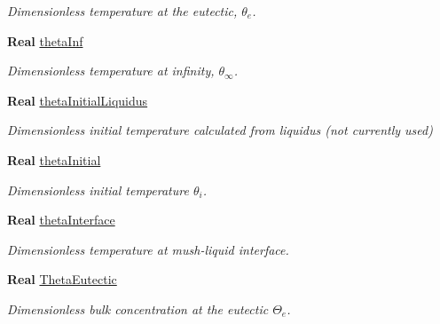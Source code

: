 \begin{DoxyCompactItemize}
\begin{DoxyCompactList}\small\item\em Dimensionless temperature at the eutectic, $ \theta_e $. \end{DoxyCompactList}\item 
\mbox{\label{class_mushy_layer_params_a5fbe1ecc5dec8ea3d40f2f790207245c}} 
\textbf{ Real} \hyperlink{class_mushy_layer_params_a5fbe1ecc5dec8ea3d40f2f790207245c}{theta\+Inf}
\begin{DoxyCompactList}\small\item\em Dimensionless temperature at infinity, $ \theta_\infty $. \end{DoxyCompactList}\item 
\mbox{\label{class_mushy_layer_params_a5cbbc3540205aa69d2e54d1695c08c86}} 
\textbf{ Real} \hyperlink{class_mushy_layer_params_a5cbbc3540205aa69d2e54d1695c08c86}{theta\+Initial\+Liquidus}
\begin{DoxyCompactList}\small\item\em Dimensionless initial temperature calculated from liquidus (not currently used) \end{DoxyCompactList}\item 
\mbox{\label{class_mushy_layer_params_a8f801f6995fcd9d6cbe8a99fb07c4aaf}} 
\textbf{ Real} \hyperlink{class_mushy_layer_params_a8f801f6995fcd9d6cbe8a99fb07c4aaf}{theta\+Initial}
\begin{DoxyCompactList}\small\item\em Dimensionless initial temperature $ \theta_i $. \end{DoxyCompactList}\item 
\textbf{ Real} \hyperlink{class_mushy_layer_params_a4f5bbe8dd1098ccc6bac03fce6b6bfa0}{theta\+Interface}
\begin{DoxyCompactList}\small\item\em Dimensionless temperature at mush-\/liquid interface. \end{DoxyCompactList}\item 
\mbox{\label{class_mushy_layer_params_add018c55cd0f09f969e3fa03872c6cf3}} 
\textbf{ Real} \hyperlink{class_mushy_layer_params_add018c55cd0f09f969e3fa03872c6cf3}{Theta\+Eutectic}
\begin{DoxyCompactList}\small\item\em Dimensionless bulk concentration at the eutectic $ \Theta_e $. \end{DoxyCompactList}\item 

\end{DoxyCompactItemize}
